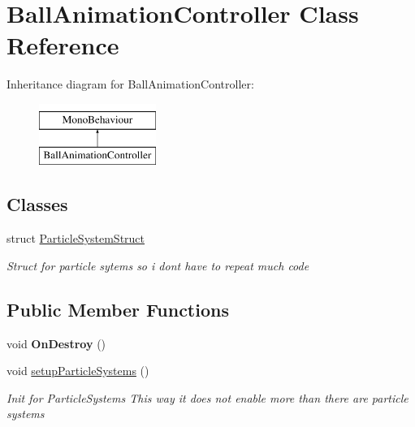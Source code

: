 \hypertarget{class_ball_animation_controller}{}\section{Ball\+Animation\+Controller Class Reference}
\label{class_ball_animation_controller}
Inheritance diagram for Ball\+Animation\+Controller\+:\begin{figure}[H]
\begin{center}
\leavevmode
\includegraphics[height=2.000000cm]{class_ball_animation_controller}
\end{center}
\end{figure}
\subsection*{Classes}
\begin{DoxyCompactItemize}
\item 
struct \hyperlink{struct_ball_animation_controller_1_1_particle_system_struct}{Particle\+System\+Struct}
\begin{DoxyCompactList}\small\item\em Struct for particle sytems so i don\textquotesingle{}t have to repeat much code \end{DoxyCompactList}\end{DoxyCompactItemize}
\subsection*{Public Member Functions}
\begin{DoxyCompactItemize}
\item 
void {\bfseries On\+Destroy} ()\hypertarget{class_ball_animation_controller_adafe51d20a1590069256f5ed9c7145f3}{}\label{class_ball_animation_controller_adafe51d20a1590069256f5ed9c7145f3}

\item 
void \hyperlink{class_ball_animation_controller_a19beeaad6706755e27cfefe0dd289665}{setup\+Particle\+Systems} ()
\begin{DoxyCompactList}\small\item\em Init for Particle\+Systems This way it does not enable more than there are particle systems \end{DoxyCompactList}\end{DoxyCompactItemize}


